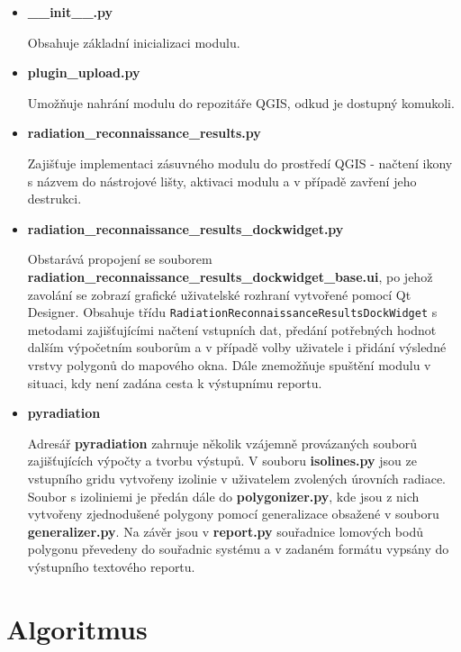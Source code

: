 \begin{itemize}
	\item \textbf{\_\_init\_\_.py} 
	
	Obsahuje základní inicializaci modulu.
		
	\item \textbf{plugin\_upload.py} 

	Umožňuje nahrání modulu do repozitáře QGIS, odkud je dostupný komukoli. 

	\item \textbf{radiation\_reconnaissance\_results.py} 
	
	Zajišťuje implementaci zásuvného modulu do prostředí QGIS - načtení ikony s názvem do nástrojové lišty, aktivaci modulu a v případě zavření jeho destrukci.

	\item \textbf{radiation\_reconnaissance\_results\_dockwidget.py}
	
	Obstarává propojení se souborem \textbf{radiation\_reconnaissance\_results\_dockwidget\_base.ui}, po jehož zavolání se zobrazí grafické uživatelské rozhraní vytvořené pomocí Qt Designer. Obsahuje třídu \texttt{RadiationReconnaissanceResultsDockWidget} s metodami zajišťujícími načtení vstupních dat, předání potřebných hodnot dalším výpočetním souborům a v případě volby uživatele i přidání výsledné vrstvy polygonů do mapového okna. Dále znemožňuje spuštění modulu v situaci, kdy není zadána cesta k výstupnímu reportu.

	\item \textbf{pyradiation}
		
		Adresář \textbf{pyradiation} zahrnuje několik vzájemně provázaných souborů zajišťujících výpočty a tvorbu výstupů. V souboru \textbf{isolines.py} jsou ze vstupního gridu vytvořeny izolinie v uživatelem zvolených úrovních radiace. Soubor s izoliniemi je předán dále do \textbf{polygonizer.py}, kde jsou z nich vytvořeny zjednodušené polygony pomocí generalizace obsažené v souboru \textbf{generalizer.py}. Na závěr jsou v \textbf{report.py} souřadnice lomových bodů polygonu převedeny do souřadnic systému  a v zadaném formátu vypsány do výstupního textového reportu.
	
\end{itemize}

\section{Algoritmus}

